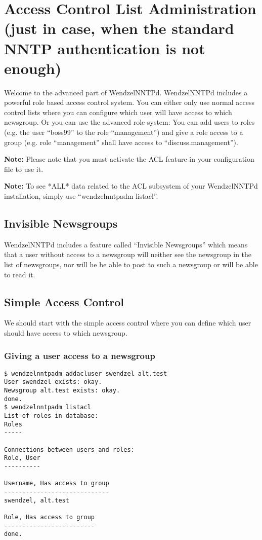\section{Access Control List Administration (just in case, when the standard NNTP authentication is not enough)}

Welcome to the advanced part of WendzelNNTPd. WendzelNNTPd includes a powerful role based access control system. You can either only use normal access control lists where you can configure which user will have access to which newsgroup. Or you can use the advanced role system: You can add users to roles (e.g. the user ``boss99'' to the role ``management'') and give a role access to a group (e.g. role ``management'' shall have access to ``discuss.management'').

\textbf{Note:} Please note that you must activate the ACL feature in your configuration file to use it.

\textbf{Note:} To see *ALL* data related to the ACL subsystem of your WendzelNNTPd installation, simply use ``wendzelnntpadm listacl''.

\subsection{Invisible Newsgroups}

WendzelNNTPd includes a feature called ``Invisible Newsgroups'' which means that a user without access to a newsgroup will neither see the newsgroup in the list of newsgroups, nor will he be able to post to such a newsgroup or will be able to read it.

\subsection{Simple Access Control}

We should start with the simple access control where you can define which user should have access to which newsgroup.

\subsubsection{Giving a user access to a newsgroup}

\begin{verbatim}
$ wendzelnntpadm addacluser swendzel alt.test
User swendzel exists: okay.
Newsgroup alt.test exists: okay.
done.
$ wendzelnntpadm listacl
List of roles in database:
Roles
-----

Connections between users and roles:
Role, User
----------

Username, Has access to group
-----------------------------
swendzel, alt.test

Role, Has access to group
-------------------------
done.
\end{verbatim}

